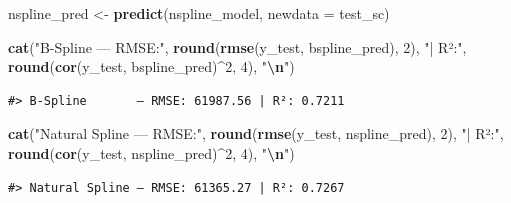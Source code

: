 \documentclass[
]{article}
\newenvironment{Shaded}{\begin{snugshade}}{\end{snugshade}}
\newcommand{\AttributeTok}[1]{\textcolor[rgb]{0.13,0.29,0.53}{#1}}
\newcommand{\DecValTok}[1]{\textcolor[rgb]{0.00,0.00,0.81}{#1}}
\newcommand{\FunctionTok}[1]{\textcolor[rgb]{0.13,0.29,0.53}{\textbf{#1}}}
\newcommand{\NormalTok}[1]{#1}
\newcommand{\OtherTok}[1]{\textcolor[rgb]{0.56,0.35,0.01}{#1}}
\newcommand{\SpecialCharTok}[1]{\textcolor[rgb]{0.81,0.36,0.00}{\textbf{#1}}}
\newcommand{\StringTok}[1]{\textcolor[rgb]{0.31,0.60,0.02}{#1}}
\begin{document}
\begin{Shaded}
\begin{Highlighting}[]
\NormalTok{nspline\_pred }\OtherTok{\textless{}{-}} \FunctionTok{predict}\NormalTok{(nspline\_model, }\AttributeTok{newdata =}\NormalTok{ test\_sc)}

\FunctionTok{cat}\NormalTok{(}\StringTok{"B{-}Spline       — RMSE:"}\NormalTok{, }\FunctionTok{round}\NormalTok{(}\FunctionTok{rmse}\NormalTok{(y\_test, bspline\_pred), }\DecValTok{2}\NormalTok{),}
    \StringTok{"| R²:"}\NormalTok{, }\FunctionTok{round}\NormalTok{(}\FunctionTok{cor}\NormalTok{(y\_test, bspline\_pred)}\SpecialCharTok{\^{}}\DecValTok{2}\NormalTok{, }\DecValTok{4}\NormalTok{), }\StringTok{"}\SpecialCharTok{\textbackslash{}n}\StringTok{"}\NormalTok{)}
\end{Highlighting}
\end{Shaded}

\begin{verbatim}
#> B-Spline       — RMSE: 61987.56 | R²: 0.7211
\end{verbatim}

\begin{Shaded}
\begin{Highlighting}[]
\FunctionTok{cat}\NormalTok{(}\StringTok{"Natural Spline — RMSE:"}\NormalTok{, }\FunctionTok{round}\NormalTok{(}\FunctionTok{rmse}\NormalTok{(y\_test, nspline\_pred), }\DecValTok{2}\NormalTok{),}
    \StringTok{"| R²:"}\NormalTok{, }\FunctionTok{round}\NormalTok{(}\FunctionTok{cor}\NormalTok{(y\_test, nspline\_pred)}\SpecialCharTok{\^{}}\DecValTok{2}\NormalTok{, }\DecValTok{4}\NormalTok{), }\StringTok{"}\SpecialCharTok{\textbackslash{}n}\StringTok{"}\NormalTok{)}
\end{Highlighting}
\end{Shaded}

\begin{verbatim}
#> Natural Spline — RMSE: 61365.27 | R²: 0.7267
\end{verbatim}
\end{document}

